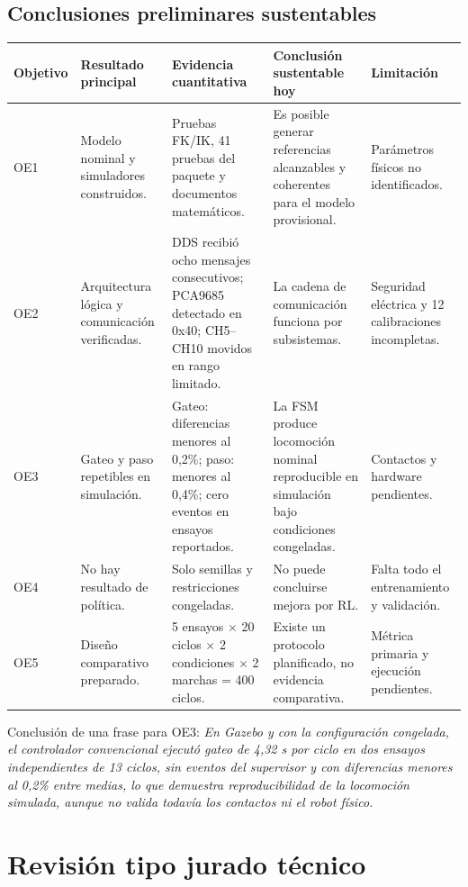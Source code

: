 \documentclass[11pt,letterpaper]{article}
\begin{document}
\begin{landscape}
\section{Conclusiones preliminares sustentables}
\small
\begin{longtable}{p{1.6cm}p{4.5cm}p{4.5cm}p{4.7cm}p{3.8cm}}
\toprule
\textbf{Objetivo} & \textbf{Resultado principal} & \textbf{Evidencia cuantitativa} & \textbf{Conclusión sustentable hoy} & \textbf{Limitación}\\
\midrule
OE1 & Modelo nominal y simuladores construidos. & Pruebas FK/IK, 41 pruebas del paquete y documentos matemáticos. & Es posible generar referencias alcanzables y coherentes para el modelo provisional. & Parámetros físicos no identificados.\\
OE2 & Arquitectura lógica y comunicación verificadas. & DDS recibió ocho mensajes consecutivos; PCA9685 detectado en 0x40; CH5--CH10 movidos en rango limitado. & La cadena de comunicación funciona por subsistemas. & Seguridad eléctrica y 12 calibraciones incompletas.\\
OE3 & Gateo y paso repetibles en simulación. & Gateo: diferencias menores al 0,2\%; paso: menores al 0,4\%; cero eventos en ensayos reportados. & La FSM produce locomoción nominal reproducible en simulación bajo condiciones congeladas. & Contactos y hardware pendientes.\\
OE4 & No hay resultado de política. & Solo semillas y restricciones congeladas. & No puede concluirse mejora por RL. & Falta todo el entrenamiento y validación.\\
OE5 & Diseño comparativo preparado. & 5 ensayos $\times$ 20 ciclos $\times$ 2 condiciones $\times$ 2 marchas = 400 ciclos. & Existe un protocolo planificado, no evidencia comparativa. & Métrica primaria y ejecución pendientes.\\
\bottomrule
\end{longtable}
\end{landscape}

Conclusión de una frase para OE3: \emph{En Gazebo y con la configuración
congelada, el controlador convencional ejecutó gateo de 4,32 s por ciclo en dos
ensayos independientes de 13 ciclos, sin eventos del supervisor y con
diferencias menores al 0,2\% entre medias, lo que demuestra reproducibilidad de
la locomoción simulada, aunque no valida todavía los contactos ni el robot
físico.}

\section{Revisión tipo jurado técnico}
\end{document}
